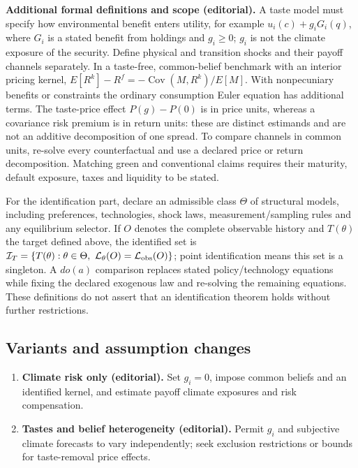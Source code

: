 \documentclass[11pt,a4paper]{article}
\begin{document}
\textbf{Additional formal definitions and scope (editorial).} A taste model must specify how environmental benefit enters utility, for example \(u_i(c)+g_i G_i(q)\), where \(G_i\) is a stated benefit from holdings and \(g_i\geq0\); \(g_i\) is not the climate exposure of the security. Define physical and transition shocks and their payoff channels separately. In a taste-free, common-belief benchmark with an interior pricing kernel, \(E[R^k]-R^f=-\operatorname{Cov}(M,R^k)/E[M]\). With nonpecuniary benefits or constraints the ordinary consumption Euler equation has additional terms. The taste-price effect \(P(g)-P(0)\) is in price units, whereas a covariance risk premium is in return units: these are distinct estimands and are not an additive decomposition of one spread. To compare channels in common units, re-solve every counterfactual and use a declared price or return decomposition. Matching green and conventional claims requires their maturity, default exposure, taxes and liquidity to be stated.

For the identification part, declare an admissible class \(\Theta\) of structural models, including preferences, technologies, shock laws, measurement/sampling rules and any equilibrium selector. If \(O\) denotes the complete observable history and \(T(\theta)\) the target defined above, the identified set is \(\mathcal I_T=\{T(\theta):\theta\in\Theta,\ \mathcal L_\theta(O)=\mathcal L_{\rm obs}(O)\}\); point identification means this set is a singleton. A \(do(a)\) comparison replaces stated policy/technology equations while fixing the declared exogenous law and re-solving the remaining equations. These definitions do not assert that an identification theorem holds without further restrictions.
\subsection*{Variants and assumption changes}
\begin{enumerate}
\item \textbf{Climate risk only (editorial).} Set \(g_i=0\), impose common beliefs and an identified kernel, and estimate payoff climate exposures and risk compensation.
\item \textbf{Tastes and belief heterogeneity (editorial).} Permit \(g_i\) and subjective climate forecasts to vary independently; seek exclusion restrictions or bounds for taste-removal price effects.
\end{enumerate}
\end{document}
